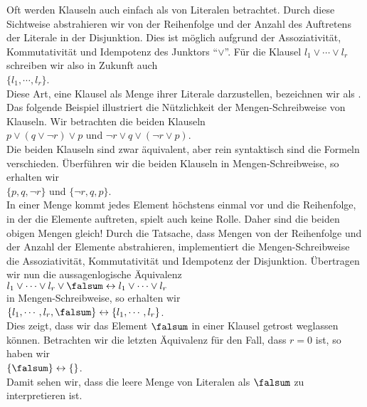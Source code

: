 Oft werden Klauseln auch einfach als  von Literalen betrachtet.  
Durch diese Sichtweise abstrahieren wir von der Reihenfolge und der Anzahl des Auftretens
der Literale in der Disjunktion.  Dies ist möglich aufgrund der Assoziativität, Kommutativität und
Idempotenz des Junktors ``$\vee$''.  Für die Klausel $l_1 \vee \cdots \vee l_r$ schreiben
wir also in Zukunft auch 
\\[0.2cm]
\hspace*{1.3cm} $\{ l_1, \cdots, l_r \}$.
\\[0.2cm]
Diese Art, eine Klausel als Menge ihrer Literale darzustellen, bezeichnen wir als
.  
Das folgende Beispiel illustriert die Nützlichkeit der Mengen-Schreibweise von Klauseln.
Wir betrachten die beiden Klauseln
\\[0.2cm]
\hspace*{1.3cm}
$p \vee (q \vee \neg r) \vee p$ \quad und \quad $\neg r \vee q \vee (\neg r \vee p)$. 
\\[0.2cm]
Die beiden Klauseln sind zwar äquivalent, aber rein syntaktisch sind die Formeln verschieden.
Überführen wir die beiden Klauseln in Mengen-Schreibweise, so erhalten wir
\\[0.2cm]
\hspace*{1.3cm}
$\{p, q, \neg r \}$ \quad und \quad $\{ \neg r, q, p \}$. 
\\[0.2cm]
In einer Menge kommt jedes Element höchstens einmal vor und die Reihenfolge, in der die
Elemente auftreten, spielt auch keine Rolle.  Daher sind die beiden obigen Mengen gleich!
Durch die Tatsache, dass Mengen von der Reihenfolge und der Anzahl der Elemente
abstrahieren, implementiert die Mengen-Schreibweise die Assoziativität, Kommutativität und
Idempotenz der Disjunktion.  Über\-tragen wir nun die  aussagenlogische Äquivalenz
\\[0.2cm]
\hspace*{1.3cm}
$l_1 \vee \cdots \vee l_r \vee \falsum \leftrightarrow l_1 \vee \cdots \vee l_r$
\\[0.2cm]
in Mengen-Schreibweise, so erhalten wir
\\[0.2cm]
\hspace*{1.3cm}
$\{ l_1, \cdots, l_r, \falsum \} \leftrightarrow \{ l_1, \cdots, l_r \}$.
\\[0.2cm]
Dies zeigt, dass wir das Element $\falsum$ in einer Klausel getrost weglassen können.
Betrachten wir die letzten Äquivalenz für den Fall, dass $r=0$ ist, so haben wir
\\[0.2cm]
\hspace*{1.3cm}
$\{\falsum \} \leftrightarrow \{\}$.
\\[0.2cm]
Damit sehen wir, dass die leere Menge von Literalen als $\falsum$ zu interpretieren ist.

